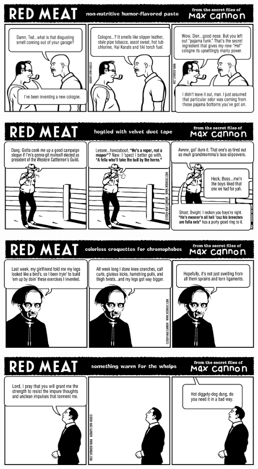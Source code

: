 \documentclass[a4paper,twoside,11pt]{article}
\begin{document}
\includegraphics[width=\textwidth]{redmeat_2004-08-03.png}



\includegraphics[width=\textwidth]{redmeat_2004-08-10.png}



\includegraphics[width=\textwidth]{redmeat_2004-08-17.png}



\includegraphics[width=\textwidth]{redmeat_2004-08-24.png}
\end{document}
